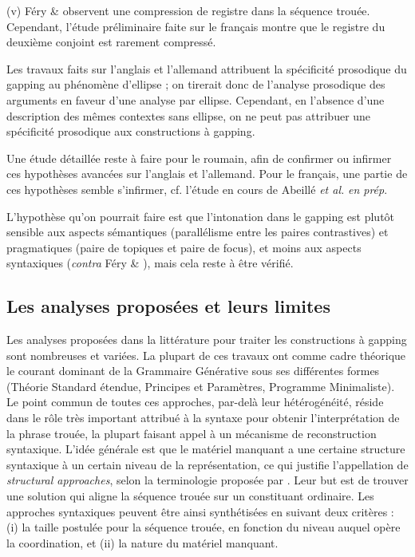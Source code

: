 (v) Féry \& \citet{Hartmann2000} observent une compression de registre dans la séquence trouée. Cependant, l'étude préliminaire faite sur le français montre que le registre du deuxième conjoint est rarement compressé. 

Les travaux faits sur l'anglais et l'allemand attribuent la spécificité prosodique du gapping au phénomène d'ellipse ; on tirerait donc de l'analyse prosodique des arguments en faveur d'une analyse par ellipse. Cependant, en l'absence d'une description des mêmes contextes sans ellipse, on ne peut pas attribuer une spécificité prosodique aux constructions à gapping.

Une étude détaillée reste à faire pour le roumain, afin de confirmer ou infirmer ces hypothèses avancées sur l'anglais et l'allemand. Pour le français, une partie de ces hypothèses semble s'infirmer, cf. l'étude en cours de Abeillé \textit{et al.} \textit{en prép}.

L'hypothèse qu'on pourrait faire est que l'intonation dans le gapping est plutôt sensible aux aspects sémantiques (parallélisme entre les paires contrastives) et pragmatiques (paire de topiques et paire de focus), et moins aux aspects syntaxiques (\textit{contra} Féry \& \citet{Hartmann2005}), mais cela reste à être vérifié.

\subsection{Les analyses proposées et leurs limites}
\label{bkm:Ref300922524}Les analyses proposées dans la littérature pour traiter les constructions à gapping sont nombreuses et variées. La plupart de ces travaux ont comme cadre théorique le courant dominant de la Grammaire Générative sous ses différentes formes (Théorie Standard étendue, Principes et Paramètres, Programme Minimaliste). Le point commun de toutes ces approches, par-delà leur hétérogénéité, réside dans le rôle très important attribué à la syntaxe pour obtenir l'interprétation de la phrase trouée, la plupart faisant appel à un mécanisme de reconstruction syntaxique. L'idée générale est que le matériel manquant a une certaine structure syntaxique à un certain niveau de la représentation, ce qui justifie l'appellation de \textit{structural approaches}, selon la terminologie proposée par \citet{Merchant2009}. Leur but est de trouver une solution qui aligne la séquence trouée sur un constituant ordinaire. Les approches syntaxiques peuvent être ainsi synthétisées en suivant deux critères : (i) la taille postulée pour la séquence trouée, en fonction du niveau auquel opère la coordination, et (ii) la nature du matériel manquant.  

